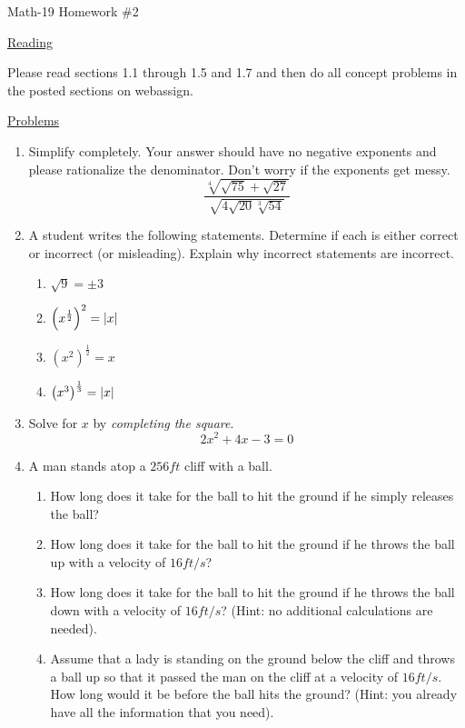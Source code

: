 \documentclass[letterpaper,12pt,fleqn]{article}
\begin{document}
\begin{center}
\Large Math-19 Homework \#2
\end{center}

\vspace{0.5in}

\underline{Reading}

Please read sections 1.1 through 1.5 and 1.7 and then do all concept problems
in the posted sections on web\-assign.

\underline{Problems}

\begin{enumerate}
\item Simplify completely. Your answer should have no negative exponents and
please rationalize the denominator. Don't worry if the exponents get messy.
\[\frac{\sqrt[4]{\sqrt{75}+\sqrt{27}}}{\sqrt{4\sqrt{20}\sqrt[3]{54}}}\]

\item A student writes the following statements. Determine if each is either
correct or incorrect (or misleading). Explain why incorrect statements are
incorrect.
\begin{enumerate}
\item $\sqrt{9}=\pm3$
\item $\left(x^{\frac{1}{2}}\right)^2=\lvert x\rvert$
\item $\left(x^2\right)^{\frac{1}{2}}=x$
\item $\left(x^3\right)^{\frac{1}{3}}=\lvert x\rvert$
\end{enumerate}

\item Solve for $x$ by \emph{completing the square}.
\[2x^2+4x-3=0\]

\item A man stands atop a $256ft$ cliff with a  ball.
\begin{enumerate}
\item How long does it take for the ball to hit the ground if he simply
releases the ball?

\item How long does it take for the ball to hit the ground if he throws the
ball up with a velocity of $16 ft/s$?

\item How long does it take for the ball to hit the ground if he throws the
ball down with a velocity of $16 ft/s$? (Hint: no additional calculations are
needed).

\item Assume that a lady is standing on the ground below the cliff and throws
a ball up so that it passed the man on the cliff at a velocity of $16 ft/s$.
How long would it be before the ball hits the ground? (Hint: you already have
all the information that you need).
\end{enumerate}


\end{enumerate}
\end{document}
